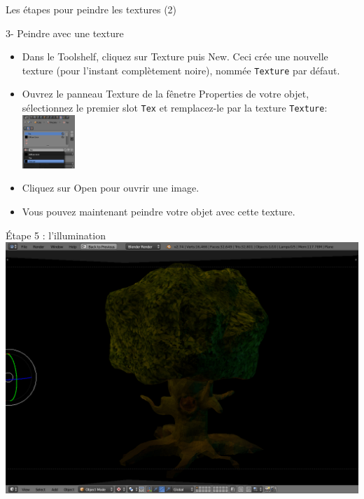 \documentclass[compress]{beamer}
\begin{document}
\begin{frame}{Les étapes pour peindre les textures (2)}
    \tiny
    \begin{multicols}{2}
        3- Peindre avec une texture

        \begin{itemize}[leftmargin=0.1cm]
            \item Dans le Toolshelf, cliquez sur {\Medium Texture} puis {\Medium
                New}.  Ceci crée une nouvelle texture (pour l'instant
                complètement noire), nommée {\tt Texture} par défaut.


            \item Ouvrez le panneau {\Medium Texture} de la fênetre {\Medium
                Properties} de votre objet, sélectionnez le premier slot {\tt Tex}
                et remplacez-le par la texture {\tt Texture}:
                \includegraphics[width=2cm]{texture1}

            \item Cliquez sur {\Medium Open} pour ouvrir une image.
            
            \item Vous pouvez maintenant peindre votre objet avec cette texture.

        \end{itemize}

    \end{multicols}

\end{frame}




\begin{frame}{Étape 5 : l'illumination}
        \centering
        \includegraphics[width=0.9\linewidth]{tree6.png}
\end{frame}
\end{document}
